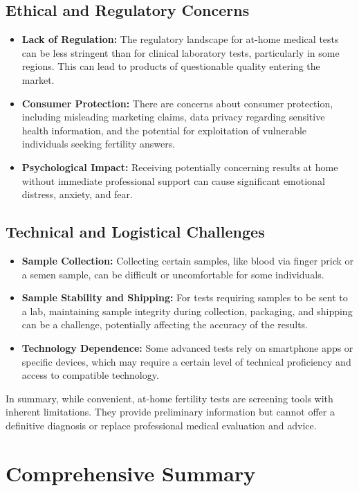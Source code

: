\documentclass{article}
\begin{document}
\subsection{Ethical and Regulatory Concerns}
\begin{itemize}
    \item \textbf{Lack of Regulation:} The regulatory landscape for at-home medical tests can be less stringent than for clinical laboratory tests, particularly in some regions. This can lead to products of questionable quality entering the market.
    \item \textbf{Consumer Protection:} There are concerns about consumer protection, including misleading marketing claims, data privacy regarding sensitive health information, and the potential for exploitation of vulnerable individuals seeking fertility answers.
    \item \textbf{Psychological Impact:} Receiving potentially concerning results at home without immediate professional support can cause significant emotional distress, anxiety, and fear.
\end{itemize}

\subsection{Technical and Logistical Challenges}
\begin{itemize}
    \item \textbf{Sample Collection:} Collecting certain samples, like blood via finger prick or a semen sample, can be difficult or uncomfortable for some individuals.
    \item \textbf{Sample Stability and Shipping:} For tests requiring samples to be sent to a lab, maintaining sample integrity during collection, packaging, and shipping can be a challenge, potentially affecting the accuracy of the results.
    \item \textbf{Technology Dependence:} Some advanced tests rely on smartphone apps or specific devices, which may require a certain level of technical proficiency and access to compatible technology.
\end{itemize}

In summary, while convenient, at-home fertility tests are screening tools with inherent limitations. They provide preliminary information but cannot offer a definitive diagnosis or replace professional medical evaluation and advice.

\section{Comprehensive Summary}
\end{document}
